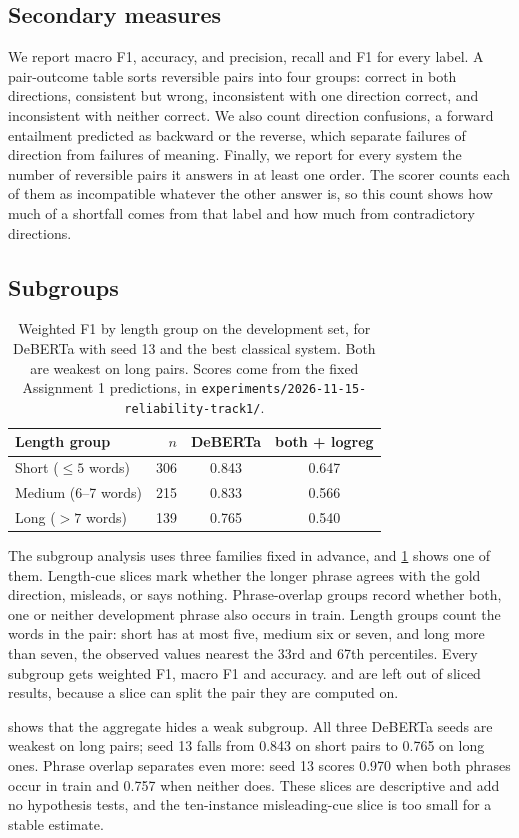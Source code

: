 \subsection{Secondary measures}

We report macro F1, accuracy, and precision, recall and F1 for every label. A pair-outcome table sorts reversible pairs into four groups: correct in both directions, consistent but wrong, inconsistent with one direction correct, and inconsistent with neither correct. We also count direction confusions, a forward entailment predicted as backward or the reverse, which separate failures of direction from failures of meaning. Finally, we report for every system the number of reversible pairs it answers \NO{} in at least one order. The scorer counts each of them as incompatible whatever the other answer is, so this count shows how much of a \SoftCons{} shortfall comes from that label and how much from contradictory directions.

\subsection{Subgroups}

\begin{table}[t]
\centering
\small
\begin{tabular}{@{}lrcc@{}}
\toprule
Length group & $n$ & DeBERTa & both + logreg \\
\midrule
Short ($\leq 5$ words) & 306 & 0.843 & 0.647 \\
Medium (6--7 words) & 215 & 0.833 & 0.566 \\
Long ($> 7$ words) & 139 & 0.765 & 0.540 \\
\bottomrule
\end{tabular}
\caption{Weighted F1 by length group on the development set, for DeBERTa with seed 13 and the best classical system. Both are weakest on long pairs. Scores come from the fixed Assignment 1 predictions, in \texttt{experiments/2026-11-15-reliability-track1/}.}
\label{tab:length-subgroups}
\end{table}

The subgroup analysis uses three families fixed in advance, and \cref{tab:length-subgroups} shows one of them. Length-cue slices mark whether the longer phrase agrees with the gold direction, misleads, or says nothing. Phrase-overlap groups record whether both, one or neither development phrase also occurs in train. Length groups count the words in the pair: short has at most five, medium six or seven, and long more than seven, the observed values nearest the 33rd and 67th percentiles. Every subgroup gets weighted F1, macro F1 and accuracy. \SoftCons{} and \HardCons{} are left out of sliced results, because a slice can split the pair they are computed on.


 shows that the aggregate hides a weak subgroup. All three DeBERTa seeds are weakest on long pairs; seed 13 falls from 0.843 on short pairs to 0.765 on long ones. Phrase overlap separates even more: seed 13 scores 0.970 when both phrases occur in train and 0.757 when neither does. These slices are descriptive and add no hypothesis tests, and the ten-instance misleading-cue slice is too small for a stable estimate.
